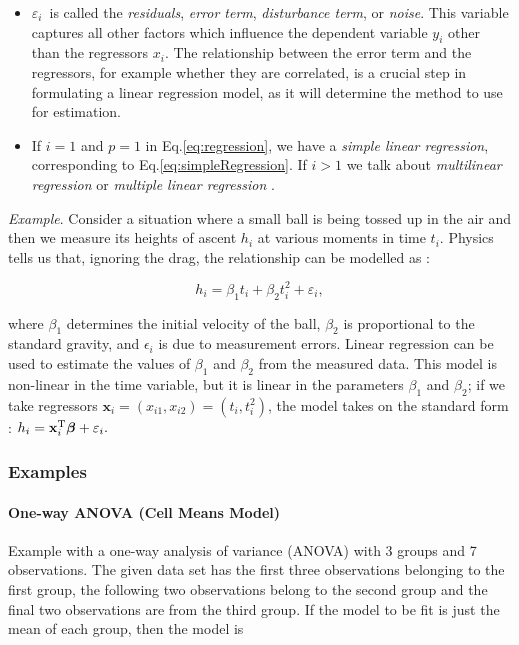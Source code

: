 \begin{itemize}
  \item $\varepsilon_i\,$ is called the \emph{residuals}, \emph{error term}, \emph{disturbance term}, or \emph{noise}. This variable captures all other factors which influence the dependent variable $y_i$ other than the regressors $x_i$. The relationship between the error term and the regressors, for example whether they are correlated, is a crucial step in formulating a linear regression model, as it will determine the method to use for estimation.
  \item If $i=1$ and $p=1$ in Eq.\ref{eq:regression}, we have a \emph{simple linear regression}, corresponding to Eq.\ref{eq:simpleRegression}. If $i>1$ we talk about \emph{multilinear regression}  or \emph{multiple linear regression} .

\end{itemize}
\emph{Example}. Consider a situation where a small ball is being tossed up in the air and then we measure its heights of ascent $h_i$ at various moments in time $t_i$. Physics tells us that, ignoring the drag, the relationship can be modelled as
:

\begin{equation}
 h_i = \beta_1 t_i + \beta_2 t_i^2 + \varepsilon_i,
\end{equation}

where $\beta_1$ determines the initial velocity of the ball, $\beta_2$ is proportional to the standard gravity, and $\epsilon_i$ is due to measurement errors. Linear regression can be used to estimate the values of $\beta_1$ and $\beta_2$ from the measured data. This model is non-linear in the time variable, but it is linear in the parameters $\beta_1$ and $\beta_2$; if we take regressors $\mathbf{x}_i = (x_{i1},x_{i2}) = (t_i,t_i^2)$, the model takes on the standard form
:
 $h_i = \mathbf{x}^{\rm T}_i\boldsymbol\beta + \varepsilon_i.$


\subsubsection{Examples}
\paragraph{One-way ANOVA (Cell Means Model)}
Example with a one-way analysis of variance (ANOVA) with 3 groups and 7 observations. The given data set has the first three observations belonging to the first group, the following two observations belong to the second group and the final two observations are from the third group.
If the model to be fit is just the mean of each group, then the model is


